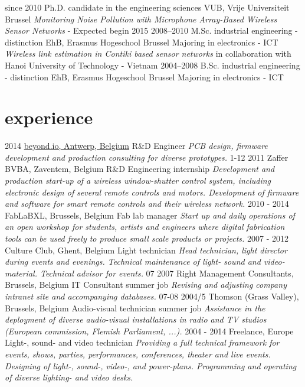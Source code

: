 \documentclass[print]{friggeri-cv}
\begin{document}
\begin{entrylist}
  \entry
    {since 2010}
    {Ph.D. {\normalfont candidate in the engineering sciences}}
    {VUB, Vrije Universiteit Brussel}
    {\emph{Monitoring Noise Pollution with Microphone Array-Based Wireless Sensor Networks} - Expected begin 2015}
  \entry
    {2008–2010}
    {M.Sc. {\normalfont industrial engineering - distinction}}
    {EhB, Erasmus Hogeschool Brussel}
    {Majoring in electronics - ICT\\
    \emph{Wireless link estimation in Contiki based sensor networks} in collaboration with Hanoi University of Technology - Vietnam}
  \entry
    {2004–2008}
    {B.Sc. {\normalfont industrial engineering - distinction}}
    {EhB, Erasmus Hogeschool Brussel}
    {Majoring in electronics - ICT}
\end{entrylist}

\section{experience}

\begin{entrylist}
  \entry
    {2014}
    {\href{http://beyond.io}{beyond.io, Antwerp, Belgium}}
    {R\&D Engineer}
    {\emph{PCB design, firmware development and production consulting for diverse prototypes.}}
  \entry
    {1-12 2011}
    {Zaffer BVBA, Zaventem, Belgium}
    {R\&D Engineering internship}
    {\emph{Development and production start-up of a wireless window-shutter control system, including electronic design of several remote controls and motors. Development of firmware and software for smart remote controls and their wireless network.}}
  \entry
    {2010 - 2014}
    {FabLaBXL, Brussels, Belgium}
    {Fab lab manager}
    {\emph{Start up and daily operations of an open workshop for students, artists and engineers where digital fabrication tools can be used freely to produce small scale products or projects.}}
  \entry
    {2007 - 2012}
    {Culture Club, Ghent, Belgium}
    {Light technician}
    {\emph{Head technician, light director during events and evenings. Technical maintenance of light- sound and video-material. Technical advisor for events.}}
  \entry
    {07 2007}
    {Right Management Consultants, Brussels, Belgium}
    {IT Consultant summer job}
    {\emph{Revising and adjusting company intranet site and accompanying databases.}}
  \entry
    {07-08 2004/5}
    {Thomson (Grass Valley), Brussels, Belgium}
    {Audio-visual technician summer job}
    {\emph{Assistance in the deployment of diverse audio-visual installations in radio and TV studios (European commission, Flemish Parliament, ...).}}
  \entry
    {2004 - 2014}
    {Freelance, Europe}
    {Light-, sound- and video technician}
    {\emph{Providing a full technical framework for events, shows, parties, performances, conferences, theater and live events. Designing of light-, sound-, video-, and power-plans. Programming and operating of diverse lighting- and video desks. 
    }}
\end{entrylist}
\end{document}
